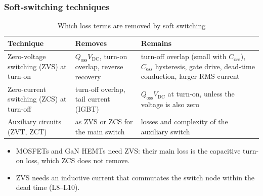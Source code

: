 \begin{frame}
	\frametitle{Soft-switching techniques}
	\begin{table}
		\centering
		\small
		\begin{tabular}{|>{\raggedright\arraybackslash}p{2.9cm}|>{\raggedright\arraybackslash}p{4.4cm}|>{\raggedright\arraybackslash}p{4.9cm}|}
			\hline
			\textbf{Technique}                    & \textbf{Removes}                                                          & \textbf{Remains}                                                                    \\
			\hline
			Zero-voltage switching (ZVS) at turn-on & $Q_\mathrm{oss}V_\mathrm{DC}$, turn-on overlap, reverse recovery          & turn-off overlap (small with $C_\mathrm{oss}$), $C_\mathrm{oss}$ hysteresis, gate drive, dead-time conduction, larger RMS current \\
			\hline
			Zero-current switching (ZCS) at turn-off & turn-off overlap, tail current (IGBT)                                    & $Q_\mathrm{oss}V_\mathrm{DC}$ at turn-on, unless the voltage is also zero              \\
			\hline
			Auxiliary circuits (ZVT, ZCT)         & as ZVS or ZCS for the main switch                                         & losses and complexity of the auxiliary switch                                       \\
			\hline
		\end{tabular}
		\caption{Which loss terms are removed by soft switching}
	\end{table}
	\begin{itemize}
		\item MOSFETs and GaN HEMTs need ZVS: their main loss is the capacitive turn-on loss, which ZCS does not remove.
		\item ZVS needs an inductive current that commutates the switch node within the dead time (L8--L10).
	\end{itemize}
\end{frame}

